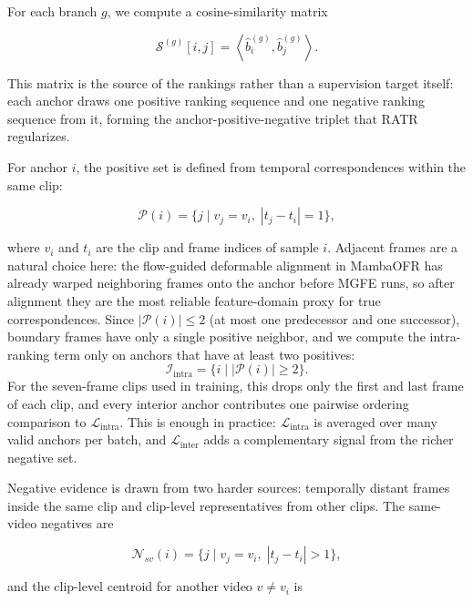 \documentclass[symmetry,article,submit,pdftex,moreauthors]{Definitions/mdpi}
\begin{document}
For each branch $g$, we compute a cosine-similarity matrix

\begin{equation}
\mathcal{S}^{(g)}[i,j] =
\left\langle
\widehat{b}_i^{(g)},
\widehat{b}_j^{(g)}
\right\rangle.
\end{equation}

This matrix is the source of the rankings rather than a supervision target itself: each anchor draws one positive ranking sequence and one negative ranking sequence from it, forming the anchor-positive-negative triplet that RATR regularizes.

For anchor $i$, the positive set is defined from temporal correspondences within the same clip:

\begin{equation}
\mathcal{P}(i)=
\bigl\{
j \mid v_j=v_i,\;
|t_j-t_i|=1
\bigr\},
\end{equation}

where $v_i$ and $t_i$ are the clip and frame indices of sample $i$. Adjacent frames are a natural choice here: the flow-guided deformable alignment in MambaOFR has already warped neighboring frames onto the anchor before MGFE runs, so after alignment they are the most reliable feature-domain proxy for true correspondences. Since $|\mathcal{P}(i)| \le 2$ (at most one predecessor and one successor), boundary frames have only a single positive neighbor, and we compute the intra-ranking term only on anchors that have at least two positives:
\begin{equation}
\mathcal{I}_{\text{intra}}=
\bigl\{
i \mid |\mathcal{P}(i)| \ge 2
\bigr\}.
\end{equation}
For the seven-frame clips used in training, this drops only the first and last frame of each clip, and every interior anchor contributes one pairwise ordering comparison to $\mathcal{L}_{\text{intra}}$. This is enough in practice: $\mathcal{L}_{\text{intra}}$ is averaged over many valid anchors per batch, and $\mathcal{L}_{\text{inter}}$ adds a complementary signal from the richer negative set.

Negative evidence is drawn from two harder sources: temporally distant frames inside the same clip and clip-level representatives from other clips. The same-video negatives are

\begin{equation}
\mathcal{N}_{sv}(i)=
\bigl\{
j \mid v_j=v_i,\;
|t_j-t_i|>1
\bigr\},
\end{equation}

and the clip-level centroid for another video $v\neq v_i$ is
\end{document}
